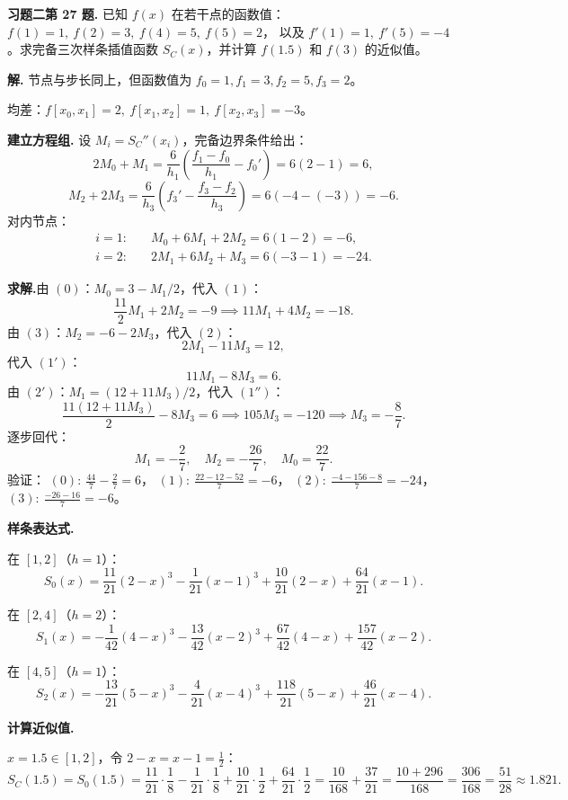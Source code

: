 \documentclass[UTF8,a4paper,11pt]{ctexart}
\begin{document}
\bigskip\bigskip

\noindent\textbf{习题二\quad 第 27 题.}\quad
已知 $f(x)$ 在若干点的函数值：$f(1)=1,\ f(2)=3,\ f(4)=5,\ f(5)=2$，
以及 $f'(1)=1,\ f'(5)=-4$。求完备三次样条插值函数 $S_C(x)$，并计算 $f(1.5)$ 和 $f(3)$ 的近似值。

\medskip
\noindent\textbf{解.}\quad
节点与步长同上，但函数值为 $f_0=1,f_1=3,f_2=5,f_3=2$。

均差：$f[x_0,x_1]=2,\ f[x_1,x_2]=1,\ f[x_2,x_3]=-3$。

\medskip
\noindent\textbf{建立方程组.}\quad
设 $M_i=S_C''(x_i)$，完备边界条件给出：
\[
  2M_0+M_1 = \frac{6}{h_1}\!\left(\frac{f_1-f_0}{h_1}-f_0'\right)=6(2-1)=6,\tag{0}
\]
\[
  M_2+2M_3 = \frac{6}{h_3}\!\left(f_3'-\frac{f_3-f_2}{h_3}\right)=6(-4-(-3))=-6.\tag{3}
\]
对内节点：
\begin{align*}
  i=1:&\quad M_0+6M_1+2M_2=6(1-2)=-6,\tag{1}\\
  i=2:&\quad 2M_1+6M_2+M_3=6(-3-1)=-24.\tag{2}
\end{align*}

\noindent\textbf{求解.}\quad 由 $(0)$：$M_0=3-M_1/2$，代入 $(1)$：
\[
  \frac{11}{2}M_1+2M_2=-9 \implies 11M_1+4M_2=-18.\tag{1'}
\]
由 $(3)$：$M_2=-6-2M_3$，代入 $(2)$：
\[
  2M_1-11M_3=12,\tag{2'}
\]
代入 $(1')$：
\[
  11M_1-8M_3=6.\tag{1''}
\]
由 $(2')$：$M_1=(12+11M_3)/2$，代入 $(1'')$：
\[
  \frac{11(12+11M_3)}{2}-8M_3=6
  \implies 105M_3=-120
  \implies M_3=-\frac{8}{7}.
\]
逐步回代：
\[
  M_1=-\frac{2}{7},\quad M_2=-\frac{26}{7},\quad M_0=\frac{22}{7}.
\]
验证：
$(0):\ \frac{44}{7}-\frac{2}{7}=6$\checkmark，
$(1):\ \frac{22-12-52}{7}=-6$\checkmark，
$(2):\ \frac{-4-156-8}{7}=-24$\checkmark，
$(3):\ \frac{-26-16}{7}=-6$\checkmark。

\medskip
\noindent\textbf{样条表达式.}\quad

\noindent 在 $[1,2]$（$h=1$）：
\[
  S_0(x)=\frac{11}{21}(2-x)^3-\frac{1}{21}(x-1)^3+\frac{10}{21}(2-x)+\frac{64}{21}(x-1).
\]

\noindent 在 $[2,4]$（$h=2$）：
\[
  S_1(x)=-\frac{1}{42}(4-x)^3-\frac{13}{42}(x-2)^3+\frac{67}{42}(4-x)+\frac{157}{42}(x-2).
\]

\noindent 在 $[4,5]$（$h=1$）：
\[
  S_2(x)=-\frac{13}{21}(5-x)^3-\frac{4}{21}(x-4)^3+\frac{118}{21}(5-x)+\frac{46}{21}(x-4).
\]

\medskip
\noindent\textbf{计算近似值.}\quad

$x=1.5\in[1,2]$，令 $2-x=x-1=\tfrac{1}{2}$：
\[
  S_C(1.5)=S_0(1.5)
  =\frac{11}{21}\cdot\frac{1}{8}-\frac{1}{21}\cdot\frac{1}{8}+\frac{10}{21}\cdot\frac{1}{2}+\frac{64}{21}\cdot\frac{1}{2}
  =\frac{10}{168}+\frac{37}{21}
  =\frac{10+296}{168}=\frac{306}{168}=\boxed{\frac{51}{28}\approx 1.821}.
\]
\end{document}
